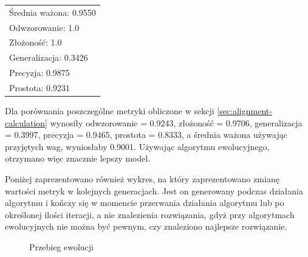  \begin{center}
  \begin{tabular}{l}
	Średnia ważona: 0.9550 \\
	Odwzorowanie: 1.0 \\
	Złożoność: 1.0 \\
	Generalizacja: 0.3426 \\
	Precyzja: 0.9875 \\
	Prostota: 0.9231
  \end{tabular}
 \end{center}

Dla porównania poszczególne metryki obliczone w sekcji \ref{sec:alignment-calculation} wynosiły odwzorowanie = 0.9243, złożoność = 0.9706, generalizacja = 0.3997, precyzja = 0.9465, prostota = 0.8333, a średnia ważona używając przyjętych wag, wyniosłaby 0.9001. Używając algorytmu ewolucyjnego, otrzymano więc znacznie lepszy model.

Poniżej zaprezentowano również wykres, na który zaprezentowano zmianę wartości metryk w kolejnych generacjach. Jest on generowany podczas działania algorytmu i kończy się w momencie przerwania działania algorytmu lub po określonej ilości iteracji, a nie znalezienia rozwiązania, gdyż przy algorytmach ewolucyjnych nie można być pewnym, czy znaleziono najlepsze rozwiązanie.
\begin{figure}[!ht]
	\caption{\label{fig:flow_chart}Przebieg ewolucji}
\end{figure}
\clearpage

